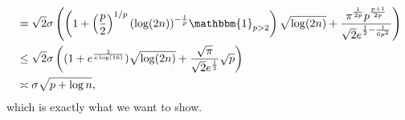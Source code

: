 \begin{answer}
\[\begin{split}
			 & = \sqrt{2}\sigma \left( \left( 1+ \left( \frac{p}{2} \right) ^{1 / p}(\log(2n))^{-\frac{1}{p}}\mathbbm{1}_{p>2} \right) \sqrt{\log(2n)} + \frac{\pi^{\frac{1}{2p}}p^{\frac{p+1}{2p}}}{\sqrt{2}e^{\frac{1}{2} - \frac{1}{6p^2}}} \right)                                       \\
			 & \leq\sqrt{2}\sigma \left( (1+e^{\frac{1}{e\log(16)}})\sqrt{\log(2n)} + \frac{\sqrt{\pi}}{\sqrt{2}e^{\frac{1}{3}}}\sqrt{p} \right)                                                                                                                                             \\
			 & \asymp \sigma\sqrt{p+\log n},
		\end{split}
	\]
	which is exactly what we want to show.
\end{answer}


